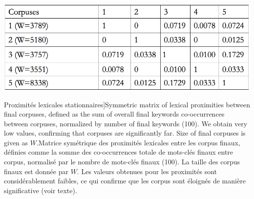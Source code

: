 \begin{table}
\centering
\includegraphics[width=0.8\linewidth]{Figures/QuantEpistemo/corpusesDistances}
\caption[Stationary lexical proximities][Proximités lexicales stationnaires]{Symmetric matrix of lexical proximities between final corpuses, defined as the sum of overall final keywords co-occurrences between corpuses, normalized by number of final keywords (100). We obtain very low values, confirming that corpuses are significantly far. Size of final corpuses is given as $W$.}{Matrice symétrique des proximités lexicales entre les corpus finaux, définies comme la somme des co-occurrences totale de mots-clés finaux entre corpus, normalisé par le nombre de mots-clés finaux (100). La taille des corpus finaux est donnée par $W$. Les valeurs obtenues pour les proximités sont considérablement faibles, ce qui confirme que les corpus sont éloignés de manière significative (voir texte).}
\label{tab:quantepistemo:lexical}
\end{table}







